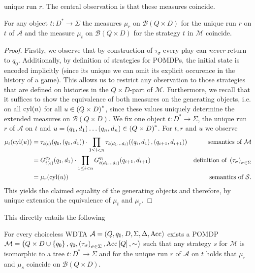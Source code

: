 unique run $r$. The central observation is that these measures coincide.
\begin{lemma}
  For any object $t:D^{*}\rightarrow\Sigma$ the measures $\mu_{r}$ on 
  $\mathcal{B}(Q\times D)$ for the unique run $r$ on $t$ of $\mathcal{A}$ and
  the measure $\mu_{t}$ on $\mathcal{B}(Q\times D)$ for the strategy $t$ in
  $\mathcal{M}$ coincide.
  \label{lem:stratistree}
\end{lemma}
\begin{proof}
  Firstly, we observe that by construction of $\tau_{\sigma}$ every play can
  \emph{never} return to $q_{0}$. Additionally, by definition of strategies for
  \acp{POMDP}, the initial state is encoded implicitly (since its unique we can
  omit its explicit occurence in the history of a game). This allows us to 
  restrict any observation to those strategies that are defined on histories in
  the $Q\times D$-part of $\mathcal{M}$. Furthermore, we recall that it 
  suffices to show the equivalence of both measures on the generating objects, 
  i.e. on all $\operatorname{cyl}(u)$ for all $u\in\left(Q\times D\right)^{*}$, since these values 
  uniquely determine the extended measures on $\mathcal{B}(Q\times D)$. We fix 
  one object $t:D^{*}\rightarrow\Sigma$, the unique run $r$ of $\mathcal{A}$ 
  on $t$ and
  $u = \left(q_{1}, d_{1}\right)\dots\left(q_{n}, d_{n}\right)\in\left(Q\times D\right)^{*}$. 
  For $t,r$ and $u$ we observe
  \begin{align*}
    \mu_{t}(\operatorname{cyl}(u)) &= \tau_{t(\epsilon)}(q_{0}, \left(q_{1}, d_{1}\right))\cdot
      \prod\limits_{1\leq i < n}\tau_{t(d_{1}\dots d_{i})}(
        \left(q_{i}, d_{1}\right), \left(q_{i+1}, d_{i+1}\right))&
          \text{semantics of }\mathcal{M}\\
    &= G_{t(\epsilon)}^{q_{0}}(q_{1}, d_{1})\cdot\prod\limits_{1\leq i < n}
      G_{t(d_{1}\dots d_{i})}^{q_{i}}(q_{i+1}, d_{i+1})&
          \text{definition of }\left(\tau_{\sigma}\right)_{\sigma\in\Sigma}\\
    &= \mu_{r}(\operatorname{cyl}(u))&\text{semantics of }\mathcal{S}.
  \end{align*}
  This yields the claimed equality of the generating objects and therefore, by
  unique extension the equivalence of $\mu_{t}$ and $\mu_{r}$.
\end{proof}

This directly entails the following
\begin{theorem}
  For every choiceless \ac{WDTA} 
  $\mathcal{A} = \left(Q, q_{0}, D, \Sigma, \Delta, \operatorname{Acc}\right)$ exists a \ac{POMDP}
  $\mathcal{M} = \left(Q\times D\cup\left\{q_{0}\right\}, q_{0}, 
  \left(\tau_{\sigma}\right)_{\sigma\in\Sigma}, \operatorname{Acc}\left[Q\right], \sim\right)$ such that
  any strategy $s$ for $\mathcal{M}$ is isomorphic to a tree
  $t:D^{*}\rightarrow\Sigma$ and for the unique run $r$ of $\mathcal{A}$ on $t$
  holds that $\mu_{r}$ and $\mu_{s}$ coincide on $\mathcal{B}(Q\times D)$.
  \label{thm:wdtaemptinesspomdp}
\end{theorem}


